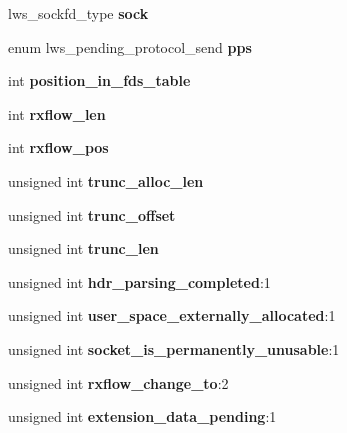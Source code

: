 \begin{DoxyCompactItemize}
lws\+\_\+sockfd\+\_\+type {\bfseries sock}
\item 
\mbox{\label{structlws_ac19d81076c90fbb7d5738e2fe6a17907}} 
enum lws\+\_\+pending\+\_\+protocol\+\_\+send {\bfseries pps}
\item 
\mbox{\label{structlws_a6d148c782503767a836b896b303e6c32}} 
int {\bfseries position\+\_\+in\+\_\+fds\+\_\+table}
\item 
\mbox{\label{structlws_aa17eaf2afaab9874ea49c5bd7e9f52e0}} 
int {\bfseries rxflow\+\_\+len}
\item 
\mbox{\label{structlws_a58fe7ec9d49c8712c29054f25cc093ab}} 
int {\bfseries rxflow\+\_\+pos}
\item 
\mbox{\label{structlws_a244d9aa462ef7931129d1f4a66b23ab5}} 
unsigned int {\bfseries trunc\+\_\+alloc\+\_\+len}
\item 
\mbox{\label{structlws_a7eb6f0249d742ea0facccc39c53cc5a3}} 
unsigned int {\bfseries trunc\+\_\+offset}
\item 
\mbox{\label{structlws_a01b50f8fa2bf5cb68c3aa60b198f9982}} 
unsigned int {\bfseries trunc\+\_\+len}
\item 
\mbox{\label{structlws_aa27e406f80b08ef847583cef8a229714}} 
unsigned int {\bfseries hdr\+\_\+parsing\+\_\+completed}\+:1
\item 
\mbox{\label{structlws_abe4d0e08a00877f6a408528dd92c4f06}} 
unsigned int {\bfseries user\+\_\+space\+\_\+externally\+\_\+allocated}\+:1
\item 
\mbox{\label{structlws_aedde22df4494f5ee219adb4992fe9715}} 
unsigned int {\bfseries socket\+\_\+is\+\_\+permanently\+\_\+unusable}\+:1
\item 
\mbox{\label{structlws_af0182d3eb678a951d170a163d3a30b44}} 
unsigned int {\bfseries rxflow\+\_\+change\+\_\+to}\+:2
\item 
\mbox{\label{structlws_aa054f04e1a0ee9c741f0d6aa06e9c7fd}} 
unsigned int {\bfseries extension\+\_\+data\+\_\+pending}\+:1

\end{DoxyCompactItemize}
